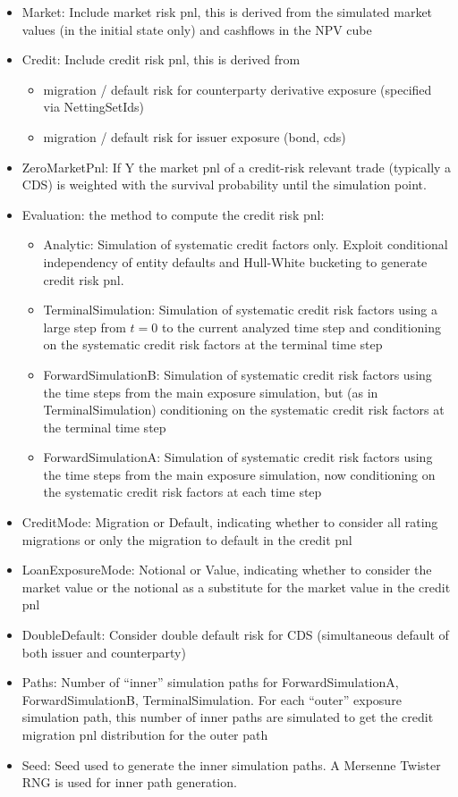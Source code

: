 \documentclass[12pt, a4paper]{article}
\begin{document}
\begin{itemize}
\item Market: Include market risk pnl, this is derived from the simulated market values (in the initial state only) and
  cashflows in the NPV cube
\item Credit: Include credit risk pnl, this is derived from
  \begin{itemize}
    \item migration / default risk for counterparty derivative exposure (specified via NettingSetIds)
    \item migration / default risk for issuer exposure (bond, cds)
  \end{itemize}
\item ZeroMarketPnl: If Y the market pnl of a credit-risk relevant trade (typically a CDS) is weighted with the survival
  probability until the simulation point.
\item Evaluation: the method to compute the credit risk pnl:
  \begin{itemize}
  \item Analytic: Simulation of systematic credit factors only. Exploit conditional independency of entity defaults and Hull-White bucketing to generate credit risk pnl.
  \item TerminalSimulation: Simulation of systematic credit risk factors using a large step from $t=0$ to the current
    analyzed time step and conditioning on the systematic credit risk factors at the terminal time step
  \item ForwardSimulationB: Simulation of systematic credit risk factors using the time steps from the main exposure
    simulation, but (as in TerminalSimulation) conditioning on the systematic credit risk factors at the terminal time
    step
  \item ForwardSimulationA: Simulation of systematic credit risk factors using the time steps from the main exposure
    simulation, now conditioning on the systematic credit risk factors at each time step
  \end{itemize}
\item CreditMode: Migration or Default, indicating whether to consider all rating migrations or only the migration to default in the credit pnl
\item LoanExposureMode: Notional or Value, indicating whether to consider the market value or the notional as a substitute for the market value in the credit pnl
\item DoubleDefault: Consider double default risk for CDS (simultaneous default of both issuer and counterparty)
\item Paths: Number of ``inner'' simulation paths for ForwardSimulationA, ForwardSimulationB, TerminalSimulation. For
    each ``outer'' exposure simulation path, this number of inner paths are simulated to get the credit migration pnl
    distribution for the outer path
\item Seed: Seed used to generate the inner simulation paths. A Mersenne Twister RNG is used for inner path generation.  
\end{itemize}
\end{document}
